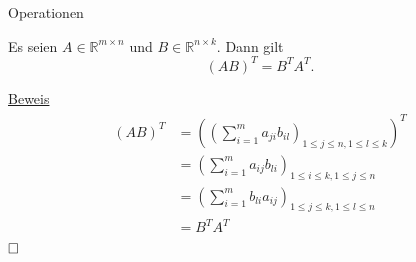 \documentclass[
  8pt,
  ignorenonframetext,
]{beamer}
\begin{document}
\begin{frame}{Operationen}
\protect\hypertarget{operationen-21}{}
\footnotesize
\begin{theorem}
\justifying
\normalfont
Es seien $A \in \mathbb{R}^{m \times n}$ und $B \in \mathbb{R}^{n \times k}$. Dann gilt
\begin{equation}
(AB)^T = B^TA^T.
\end{equation}
\end{theorem}

\underline{Beweis} \begin{align}
\begin{split}
(AB)^T
& = \left(\left(\sum_{i=1}^m a_{ji}b_{il} \right)_{1 \le j \le n, 1 \le l \le k}\right)^T \\
& = \left(\sum_{i=1}^m a_{ij}b_{li} \right)_{1 \le i \le k, 1 \le j \le n}  \\
& = \left(\sum_{i=1}^m b_{li}a_{ij} \right)_{1 \le j \le k, 1 \le l \le n}  \\
& = B^TA^T
\end{split}
\end{align} \(\hfill\Box\)
\end{frame}
\end{document}
